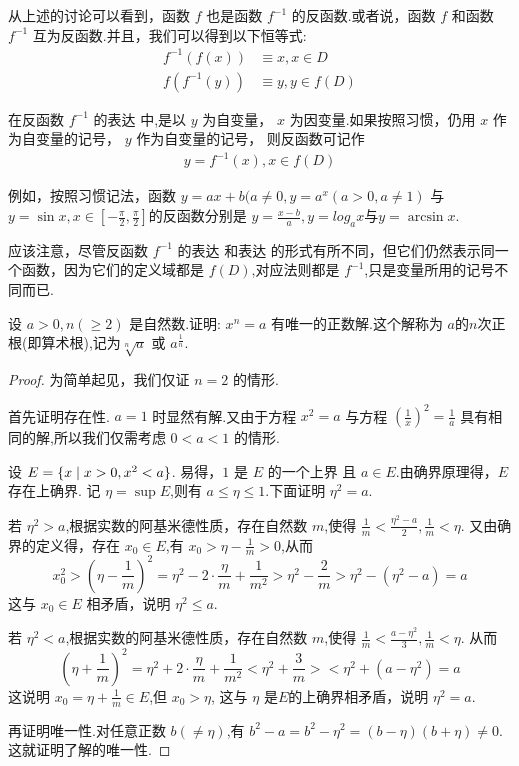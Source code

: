 从上述的讨论可以看到，函数 $f$ 也是函数 $f^{-1}$ 的反函数.或者说，函数 $f$ 和函数 $f^{-1}$ 互为反函数.并且，我们可以得到以下恒等式:
\begin{align*}
    f^{-1}(f(x))&\equiv x,x\in D \\
    f(f^{-1}(y))&\equiv y,y\in f(D)
\end{align*}

\begin{annotation}
    在反函数 $f^{-1}$ 的表达  中,是以 $y$ 为自变量， $x$ 为因变量.如果按照习惯，仍用 $x$ 作为自变量的记号， $y$ 作为自变量的记号， 则反函数可记作
    \begin{align}\label{eq:inv2}
        y=f^{-1}(x),x\in f(D)
    \end{align}

例如，按照习惯记法，函数 $y=ax+b(a\ne 0,y=a^x(a>0,a\ne 1)$ 与 $y=\sin x,x\in [-\frac{\pi}{2},\frac{\pi}{2}]$的反函数分别是 $y=\frac{x-b}{a},y=log_ax$与$y=\arcsin x$.

应该注意，尽管反函数 $f^{-1}$ 的表达 和表达 的形式有所不同，但它们仍然表示同一个函数，因为它们的定义域都是 $f(D)$,对应法则都是 $f^{-1}$,只是变量所用的记号不同而已.
\end{annotation}

\begin{example}
    设 $a>0,n(\ge 2)$ 是自然数.证明: $x^n=a$ 有唯一的正数解.这个解称为 $a$的$n$次正根(即算术根),记为$\sqrt[n]a$ 或 $a^{\frac{1}{n}}$.
\end{example}

\begin{proof}
    为简单起见，我们仅证 $n=2$ 的情形.

首先证明存在性. $a=1$ 时显然有解.又由于方程 $x^2=a$ 与方程 $(\frac{1}{x})^2=\frac{1}{a}$ 具有相同的解,所以我们仅需考虑 $0<a<1$ 的情形.

设 $E=\{x\mid x>0,x^2<a\}$. 易得，$1$ 是 $E$ 的一个上界 且 $a\in E$.由确界原理得，$E$ 存在上确界. 记 $\eta=\sup E$,则有 $a\le \eta\le 1$.下面证明 $\eta^2=a$.

\textbullet 若 $\eta^2>a$,根据实数的阿基米德性质，存在自然数 $m$,使得 $\frac{1}{m}<\frac{\eta^2-a}{2},\frac{1}{m}<\eta$. 又由确界的定义得，存在 $x_0\in E$,有 $x_0>\eta-\frac{1}{m}>0$,从而
\[
x_0^2>(\eta-\frac{1}{m})^2=\eta^2-2\cdot \frac{\eta}{m}+\frac{1}{m^2}>\eta^2-\frac{2}{m}>\eta^2-(\eta^2-a)=a
\]
这与 $x_0\in E$ 相矛盾，说明 $\eta^2\le a$.

\textbullet 若 $\eta^2<a$,根据实数的阿基米德性质，存在自然数 $m$,使得 $\frac{1}{m}<\frac{a-\eta^2}{3},\frac{1}{m}<\eta$. 从而
\[
(\eta+\frac{1}{m})^2=\eta^2+2\cdot \frac{\eta}{m}+\frac{1}{m^2}<\eta^2+\frac{3}{m}><\eta^2+(a-\eta^2)=a
\]
这说明 $x_0=\eta+\frac{1}{m}\in E$,但 $x_0>\eta$,
这与 $\eta$ 是$E$的上确界相矛盾，说明 $\eta^2= a$.

再证明唯一性.对任意正数 $b(\ne \eta)$,有 $b^2-a=b^2-\eta^2=(b-\eta)(b+\eta)\ne 0$.这就证明了解的唯一性.
\end{proof}

